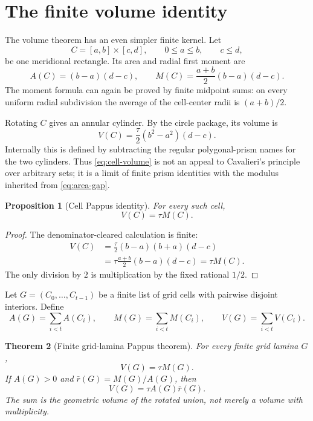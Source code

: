 \documentclass[11pt]{article}
\newtheorem{theorem}{Theorem}[section]
\newtheorem{proposition}[theorem]{Proposition}
\theoremstyle{definition}
\begin{document}
\section{The finite volume identity}
\label{sec:finite-volume}

The volume theorem has an even simpler finite kernel.  Let
\[
 C=[a,b]\times[c,d],\qquad0\leq a\leq b,\qquad c\leq d,
\]
be one meridional rectangle.  Its area and radial first moment are
\begin{equation}
 A(C)=(b-a)(d-c),
 \qquad
 M(C)=\frac{a+b}{2}(b-a)(d-c).
 \label{eq:cell-area-moment}
\end{equation}
The moment formula can again be proved by finite midpoint sums: on every
uniform radial subdivision the average of the cell-center radii is
$(a+b)/2$.

Rotating $C$ gives an annular cylinder.  By the circle package, its volume is
\begin{equation}
 V(C)=\frac{\tau}{2}(b^2-a^2)(d-c).
 \label{eq:cell-volume}
\end{equation}
Internally this is defined by subtracting the regular polygonal-prism names
for the two cylinders.  Thus \eqref{eq:cell-volume} is not an appeal to
Cavalieri's principle over arbitrary sets; it is a limit of finite prism
identities with the modulus inherited from \eqref{eq:area-gap}.

\begin{proposition}[Cell Pappus identity]
\label{prop:cell-pappus}
For every such cell,
\[
 V(C)=\tau M(C).
\]
\end{proposition}

\begin{proof}
The denominator-cleared calculation is finite:
\begin{align*}
 V(C)
 &=\frac{\tau}{2}(b-a)(b+a)(d-c)\\
 &=\tau\frac{a+b}{2}(b-a)(d-c)
 =\tau M(C).
\end{align*}
The only division by $2$ is multiplication by the fixed rational $1/2$.
\end{proof}

Let $G=(C_0,\ldots,C_{t-1})$ be a finite list of grid cells with pairwise
disjoint interiors.  Define
\[
 A(G)=\sum_{i<t}A(C_i),\qquad
 M(G)=\sum_{i<t}M(C_i),\qquad
 V(G)=\sum_{i<t}V(C_i).
\]

\begin{theorem}[Finite grid-lamina Pappus theorem]
\label{thm:grid-pappus}
For every finite grid lamina $G$,
\[
 V(G)=\tau M(G).
\]
If $A(G)>0$ and $\bar r(G)=M(G)/A(G)$, then
\[
 V(G)=\tau A(G)\bar r(G).
\]
The sum is the geometric volume of the rotated union, not merely a volume with
multiplicity.
\end{theorem}
\end{document}
